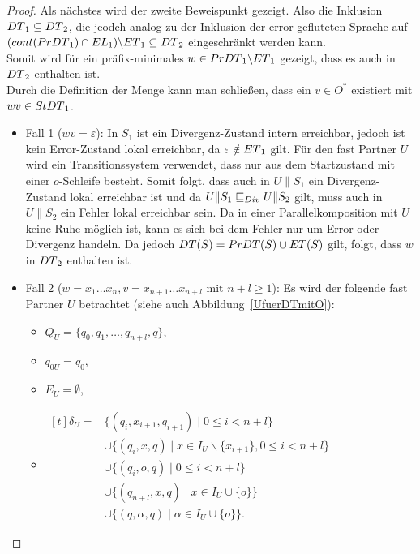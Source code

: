 \begin{proof}
  Als nächstes wird der zweite Beweispunkt gezeigt. Also die Inklusion
  $DT{}_1\subseteq DT{}_2$, die jeodch analog zu der Inklusion der
  error-gefluteten Sprache auf $(cont{}(PrDT{}_1)\cap
  EL{}_1)\backslash ET{}_1 \subseteq DT{}_2$ eingeschränkt werden kann.\\
  Somit wird für ein präfix-minimales $w\in PrDT{}_1\backslash ET{}_1$
  gezeigt, dass es auch in $DT{}_2$ enthalten ist.\\
  Durch die Definition der Menge \PrDT{} kann man schließen, dass ein $v\in
  O^*$ existiert mit $wv\in StDT{}_1$.
  \begin{itemize}
  \item Fall 1 ($wv=\varepsilon$): In $S_1$ ist ein Divergenz-Zustand intern
    erreichbar, jedoch ist kein Error-Zustand lokal erreichbar, da
    $\varepsilon\notin ET{}_1$ gilt. Für den fast Partner $U$ wird ein
    Transitionssystem verwendet, dass nur aus dem Startzustand mit einer
    $o$-Schleife besteht. Somit folgt, dass auch in $U\|S_1$ ein
    Divergenz-Zustand lokal erreichbar ist und da $U\|S_1\sqsubseteq _{Div} U\|S_2$ gilt,
    muss auch in $U\|S_2$ ein Fehler lokal erreichbar sein. Da in einer
    Parallelkomposition mit $U$ keine Ruhe möglich ist, kann es sich bei dem
    Fehler nur um Error oder Divergenz handeln. Da jedoch $DT(S) =
    PrDT{}(S)\cup ET{}(S)$ gilt, folgt, dass $w$ in $DT{}_2$ enthalten ist.
  \item Fall 2 ($w=x_1\dots x_n, v=x_{n+1}\dots x_{n+l}$ mit $n+l\geq 1$): Es
    wird der folgende fast Partner $U$ betrachtet (siehe auch
    Abbildung~\ref{UfuerDTmitO}):
      \begin{itemize}
        \item $Q_U=\{q_0,q_1,\dots ,q_{n+l}, q\}$,
        \item $q_{0U}=q_0$,
        \item $E_U=\emptyset$,
        \item $\begin{aligned}[t]
            \delta _U=&\{(q_i,x_{i+1},q_{i+1})\mid  0\leq i< n+l\}\\
                      &\cup\{(q_i,x,q)\mid  x\in I_U\backslash\{x_{i+1}\},
          0\leq i< n+l\}\\
                      &\cup\{(q_i,o,q)\mid 0\leq i< n+l\}\\
                      &\cup\{(q_{n+l},x,q)\mid x\in I_U\cup\{o\}\}\\
                      &\cup\{(q,\alpha,q)\mid \alpha\in I_U\cup\{o\}\}.
        \end{aligned}$
      \end{itemize}
      \begin{figure} [h!tbp]
      \begin{center}
\end{center}
\end{figure}
\end{itemize}
\end{proof}
